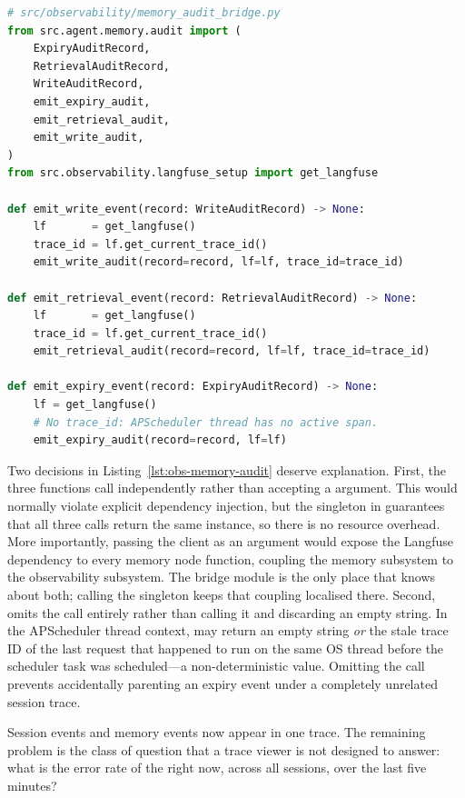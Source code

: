 \begin{lstlisting}[language=Python,
  caption={Audit bridge: trace-ID injection for session context;
  background-safe standalone emission for expiry events},
  label={lst:obs-memory-audit}]
# src/observability/memory_audit_bridge.py
from src.agent.memory.audit import (
    ExpiryAuditRecord,
    RetrievalAuditRecord,
    WriteAuditRecord,
    emit_expiry_audit,
    emit_retrieval_audit,
    emit_write_audit,
)
from src.observability.langfuse_setup import get_langfuse

def emit_write_event(record: WriteAuditRecord) -> None:
    lf       = get_langfuse()
    trace_id = lf.get_current_trace_id()
    emit_write_audit(record=record, lf=lf, trace_id=trace_id)

def emit_retrieval_event(record: RetrievalAuditRecord) -> None:
    lf       = get_langfuse()
    trace_id = lf.get_current_trace_id()
    emit_retrieval_audit(record=record, lf=lf, trace_id=trace_id)

def emit_expiry_event(record: ExpiryAuditRecord) -> None:
    lf = get_langfuse()
    # No trace_id: APScheduler thread has no active span.
    emit_expiry_audit(record=record, lf=lf)
\end{lstlisting}

Two decisions in Listing~\ref{lst:obs-memory-audit} deserve explanation.
First, the three functions call  independently
rather than accepting a  argument. This would normally
violate explicit dependency injection, but the 
singleton in  guarantees that all three calls
return the same instance, so there is no resource overhead. More
importantly, passing the client as an argument would expose the
Langfuse dependency to every memory node function, coupling the memory
subsystem to the observability subsystem. The bridge module is the
only place that knows about both; calling the singleton keeps that
coupling localised there. Second,  omits the
 call entirely rather than calling it
and discarding an empty string. In the APScheduler thread context,
 may return an empty string
\emph{or} the stale trace ID of the last request that happened to run
on the same OS thread before the scheduler task was scheduled---a
non-deterministic value. Omitting the call prevents accidentally
parenting an expiry event under a completely unrelated session trace.

Session events and memory events now appear in one trace. The remaining
problem is the class of question that a trace viewer is not designed to
answer: what is the error rate of the  right now,
across all sessions, over the last five minutes?


